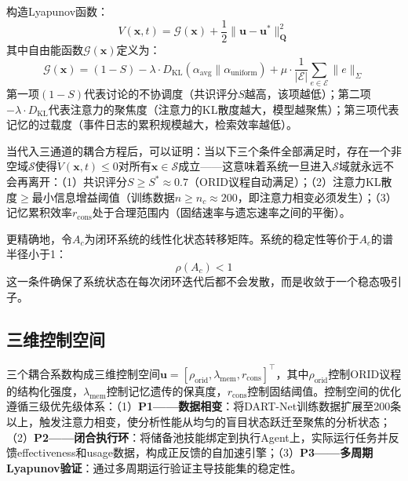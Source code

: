 \documentclass[12pt,a4paper]{ctexart}
\begin{document}
构造Lyapunov函数：
\begin{equation}
V(\mathbf{x}, t) = \mathcal{G}(\mathbf{x}) + \frac{1}{2}\|\mathbf{u} - \mathbf{u}^*\|^2_{\mathbf{Q}}
\label{eq:lyapunov}
\end{equation}
其中自由能函数$\mathcal{G}(\mathbf{x})$定义为：
\begin{equation}
\mathcal{G}(\mathbf{x}) = (1 - S) - \lambda \cdot D_{\text{KL}}(\alpha_{\text{avg}} \parallel \alpha_{\text{uniform}}) + \mu \cdot \frac{1}{|\mathcal{E}|}\sum_{e\in \mathcal{E}} \|e\|_\Sigma
\label{eq:free_energy}
\end{equation}
第一项$(1-S)$代表讨论的不协调度（共识评分$S$越高，该项越低）；第二项$-\lambda \cdot D_{\text{KL}}$代表注意力的聚焦度（注意力的KL散度越大，模型越聚焦）；第三项代表记忆的过载度（事件日志的累积规模越大，检索效率越低）。

当代入三通道的耦合方程后，可以证明：当以下三个条件全部满足时，存在一个非空域$\mathcal{S}$使得$\dot{V}(\mathbf{x}, t) \leq 0$对所有$\mathbf{x} \in \mathcal{S}$成立——这意味着系统一旦进入$\mathcal{S}$域就永远不会再离开：（1）共识评分$S \geq S^* \approx 0.7$（ORID议程自动满足）；（2）注意力KL散度$\geq$最小信息增益阈值（训练数据$n \geq n_c \approx 200$，即注意力相变必须发生）；（3）记忆累积效率$r_{\text{cons}}$处于合理范围内（固结速率与遗忘速率之间的平衡）。

更精确地，令$A_c$为闭环系统的线性化状态转移矩阵。系统的稳定性等价于$A_c$的谱半径小于1：
\begin{equation}
\rho(A_c) < 1
\label{eq:spectral}
\end{equation}
这一条件确保了系统状态在每次闭环迭代后都不会发散，而是收敛于一个稳态吸引子。

\subsection{三维控制空间}

三个耦合系数构成三维控制空间$\mathbf{u} = [\rho_{\text{orid}}, \lambda_{\text{mem}}, r_{\text{cons}}]^\top$，其中$\rho_{\text{orid}}$控制ORID议程的结构化强度，$\lambda_{\text{mem}}$控制记忆遗传的保真度，$r_{\text{cons}}$控制固结阈值。控制空间的优化遵循三级优先级体系：（1）\textbf{P1——数据相变}：将DART-Net训练数据扩展至200条以上，触发注意力相变，使分析性能从均匀的盲目状态跃迁至聚焦的分析状态；（2）\textbf{P2——闭合执行环}：将储备池技能绑定到执行Agent上，实际运行任务并反馈effectiveness和usage数据，构成正反馈的自加速引擎；（3）\textbf{P3——多周期Lyapunov验证}：通过多周期运行验证主导技能集的稳定性。
\end{document}
